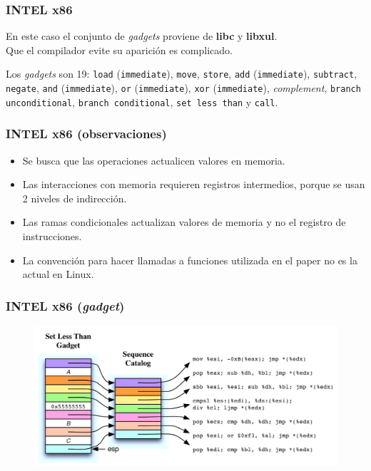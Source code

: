 \documentclass{beamer}
\newcommand { \vs } {\vspace{0.5cm}}
\begin{document}
\begin{frame}
    \frametitle{INTEL x86}
    En este caso el conjunto de \textit{gadgets} proviene de \textbf{libc} y \textbf{libxul}. \\
    
    Que el compilador evite su aparición es complicado.\vs

    Los \textit{gadgets} son 19: \texttt{load} (\texttt{immediate}), \texttt{move}, \texttt{store}, \texttt{add} (\texttt{immediate}), \texttt{subtract}, \texttt{negate}, \texttt{and} (\texttt{immediate}), \texttt{or} (\texttt{immediate}), \texttt{xor} (\texttt{immediate}), \textit{complement}, \texttt{branch unconditional}, \texttt{branch conditional}, \texttt{set less than} y \texttt{call}. 
\end{frame}

\begin{frame}
    \frametitle{INTEL x86 (observaciones)}
    \begin{itemize}
        \item Se busca que las operaciones actualicen valores en memoria.
        \item  Las interacciones con memoria requieren registros intermedios, porque se usan 2 niveles de indirección.
        \item Las ramas condicionales actualizan valores de memoria y no el registro de instrucciones.
        \item La convención para hacer llamadas a funciones utilizada en el paper no es la actual en Linux.
    \end{itemize}
\end{frame}

\begin{frame}
    \frametitle{INTEL x86 (\textit{gadget})}
    \begin{figure}
        \centering
        \includegraphics[scale=0.2]{gadgetx86.png}
    \end{figure}
\end{frame}
\end{document}
